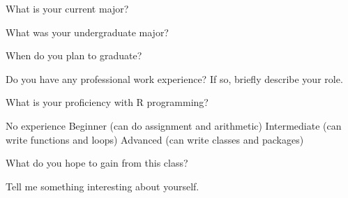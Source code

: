 \documentclass[12pt,addpoints,answers]{exam}%
\begin{document}
\runningfooter{}{}{}
\begin{center}
\makebox[\textwidth]{}
\end{center}






\begin{questions}

\question What is your current major?



\question What was your undergraduate major?


\question When do you plan to graduate?



\question Do you have any professional work experience?  If so, briefly describe your role.



\question What is your proficiency with R programming?
\begin{checkboxes}
\choice No experience
\choice Beginner (can do assignment and arithmetic)
\choice Intermediate (can write functions and loops)
\choice Advanced (can write classes and packages)
\end{checkboxes}



\question What do you hope to gain from this class?



\question Tell me something interesting about yourself.



















\end{questions}
\end{document}
